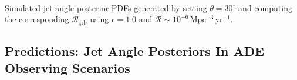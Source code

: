 \documentclass[a0,landscape]{a0poster}
\newcommand{\grbrate}{{{\mathcal R}_{\mathrm{grb}}}}
\newcommand{\cbcrate}{{{\mathcal R}}}
\begin{document}
\begin{multicols}{4}
\begin{minipage}{\columnwidth}
  \makeatletter
  \newcommand{\@captype}{figure}
  \makeatother
  \centering
  \qquad%
  \
  \caption{Simulated jet angle posterior PDFs generated by setting
      $\theta=30^{\circ}$ and computing the corresponding $\grbrate$ using
      $\epsilon=1.0$ and $\cbcrate \sim
      10^{-6}$\,Mpc$^{-3}$\,yr$^{-1}$.
  }
\end{minipage}

\subsection*{\centering Predictions: Jet Angle Posteriors In ADE Observing
Scenarios}


\end{multicols}
\end{document}
